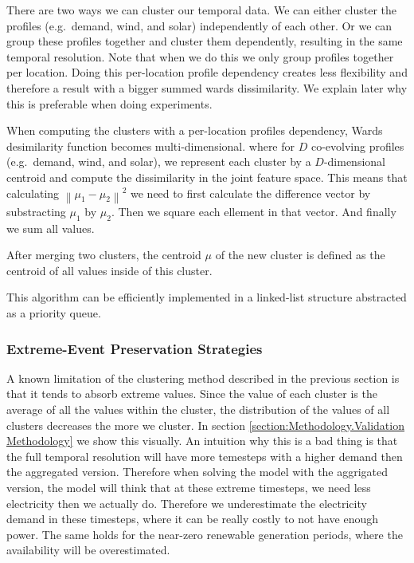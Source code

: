 There are two ways we can cluster our temporal data. We can either cluster the profiles (e.g.\ demand, wind, and solar) independently of each other. Or we can group these profiles together and cluster them dependently, resulting in the same temporal resolution. Note that when we do this we only group profiles together per location. Doing this per-location profile dependency creates less flexibility and therefore a result with a bigger summed wards dissimilarity. We explain later why this is preferable when doing experiments. 

When computing the clusters with a per-location profiles dependency, Wards desimilarity function becomes multi-dimensional. where for $D$ co-evolving profiles (e.g.\ demand, wind, and solar), we represent each cluster by a $D$-dimensional centroid and compute the dissimilarity in the joint feature space. This means that calculating $\left\| \mu_1 - \mu_2 \right\|^2$ we need to first calculate the difference vector by substracting $\mu_1$ by $\mu_2$. Then we square each ellement in that vector. And finally we sum all values.

After merging two clusters, the centroid $\mu$ of the new cluster is defined as the centroid of all values inside of this cluster.

This algorithm can be efficiently implemented in a linked-list structure abstracted as a priority queue. 

\subsubsection{Extreme-Event Preservation Strategies}

A known limitation of the clustering method described in the previous section is that it tends to absorb extreme values. Since the value of each cluster is the average of all the values within the cluster, the distribution of the values of all clusters decreases the more we cluster. In section \ref{section:Methodology.Validation Methodology} we show this visually. An intuition why this is a bad thing is that the full temporal resolution will have more temesteps with a higher demand then the aggregated version. Therefore when solving the model with the aggrigated version, the model will think that at these extreme timesteps, we need less electricity then we actually do. Therefore we underestimate the electricity demand in these timesteps, where it can be really costly to not have enough power. The same holds for the near-zero renewable generation periods, where the availability will be overestimated.

